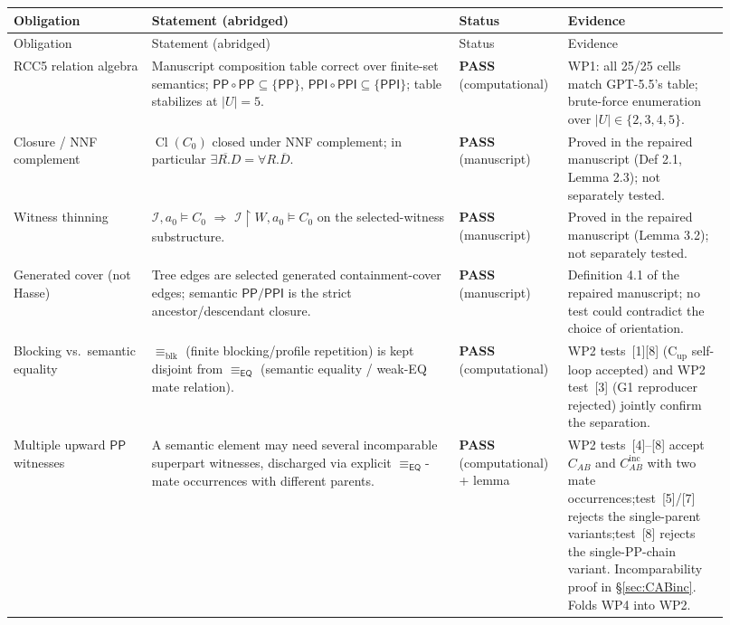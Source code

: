 \documentclass[11pt]{article}
\newcommand{\Cl}{\operatorname{Cl}}
\newcommand{\EQ}{\mathsf{EQ}}
\newcommand{\PP}{\mathsf{PP}}
\newcommand{\PPI}{\mathsf{PPI}}
\newcommand{\blk}{\equiv_{\mathrm{blk}}}
\newcommand{\eqrel}{\equiv_{\EQ}}
\newcommand{\PASS}{\textcolor{black!70!green}{\textbf{PASS}}}
\begin{document}
\begin{center}\small
\begin{longtable}{p{0.18\linewidth} p{0.40\linewidth} p{0.13\linewidth} p{0.21\linewidth}}
\toprule
Obligation & Statement (abridged) & Status & Evidence \\
\midrule
\endfirsthead
\toprule
Obligation & Statement (abridged) & Status & Evidence \\
\midrule
\endhead
\bottomrule
\endfoot

RCC5 relation algebra
  & Manuscript composition table correct over finite-set semantics;
    \(\PP\circ\PP \subseteq \{\PP\}\), \(\PPI\circ\PPI \subseteq \{\PPI\}\); table
    stabilizes at \(|U|=5\).
  & \PASS{} (computational)
  & WP1: all 25/25 cells match GPT-5.5's table; brute-force
    enumeration over \(|U| \in \{2,3,4,5\}\). \\

Closure / NNF complement
  & \(\Cl(C_0)\) closed under NNF complement; in particular
    \(\overline{\exists R.D} = \forall R.\overline D\).
  & \PASS{} (manuscript)
  & Proved in the repaired manuscript (Def 2.1, Lemma 2.3);
    not separately tested. \\

Witness thinning
  & \(\mathcal I, a_0 \models C_0\)
    \(\Rightarrow\) \(\mathcal I\upharpoonright W, a_0 \models C_0\)
    on the selected-witness substructure.
  & \PASS{} (manuscript)
  & Proved in the repaired manuscript (Lemma 3.2);
    not separately tested. \\

Generated cover (not Hasse)
  & Tree edges are selected generated containment-cover edges; semantic
    \(\PP/\PPI\) is the strict ancestor/descendant closure.
  & \PASS{} (manuscript)
  & Definition 4.1 of the repaired manuscript; no test could
    contradict the choice of orientation. \\

Blocking vs.\ semantic equality
  & \(\blk\) (finite blocking/profile repetition) is kept disjoint
    from \(\eqrel\) (semantic equality / weak-EQ mate relation).
  & \PASS{} (computational)
  & WP2 tests~[1][8] (C\(_{\mathrm{up}}\) self-loop accepted) and
    WP2 test~[3] (G1 reproducer rejected) jointly confirm the
    separation. \\

Multiple upward \(\PP\) witnesses
  & A semantic element may need several incomparable superpart
    witnesses, discharged via explicit \(\eqrel\)-mate
    occurrences with different parents.
  & \PASS{} (computational) + lemma
  & WP2 tests~[4]--[8] accept \(C_{AB}\) and \(C_{AB}^{\mathrm{inc}}\)
    with two mate occurrences;\@ test~[5]/[7] rejects the
    single-parent variants;\@ test~[8] rejects the single-PP-chain
    variant.  Incomparability proof in
    \S\ref{sec:CABinc}.  Folds WP4 into WP2. \\


\end{longtable}
\end{center}
\end{document}
